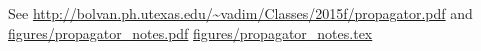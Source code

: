 See \url{http://bolvan.ph.utexas.edu/~vadim/Classes/2015f/propagator.pdf}
and \url{figures/propagator_notes.pdf} \url{figures/propagator_notes.tex}
